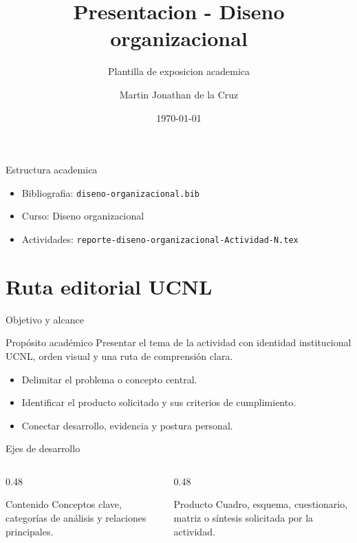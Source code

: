 ﻿\documentclass[spanish,aspectratio=169]{beamer}
\title{Presentacion - Diseno organizacional}
\subtitle{Plantilla de exposicion academica}
\author{Martin Jonathan de la Cruz}
\institute{Universidad Ciudadana de Nuevo Leon}
\date{\today}
\begin{document}
\begin{frame}
  \titlepage
\end{frame}

\begin{frame}{Estructura academica}
  \begin{itemize}
    \item Bibliografia: \texttt{diseno-organizacional.bib}
    \item Curso: Diseno organizacional
    \item Actividades: \texttt{reporte-diseno-organizacional-Actividad-N.tex}
  \end{itemize}
\end{frame}


\section{Ruta editorial UCNL}

\begin{frame}{Objetivo y alcance}
  \begin{block}{Propósito académico}
    Presentar el tema de la actividad con identidad institucional UCNL, orden visual y una ruta de comprensión clara.
  \end{block}
  \begin{itemize}
    \item Delimitar el problema o concepto central.
    \item Identificar el producto solicitado y sus criterios de cumplimiento.
    \item Conectar desarrollo, evidencia y postura personal.
  \end{itemize}
\end{frame}

\begin{frame}{Ejes de desarrollo}
  \begin{columns}[T,totalwidth=\textwidth]
    \begin{column}{0.48\textwidth}
      \begin{block}{Contenido}
        Conceptos clave, categorías de análisis y relaciones principales.
      \end{block}
    \end{column}
    \begin{column}{0.48\textwidth}
      \begin{block}{Producto}
        Cuadro, esquema, cuestionario, matriz o síntesis solicitada por la actividad.
      \end{block}
    \end{column}
  \end{columns}
\end{frame}
\end{document}
